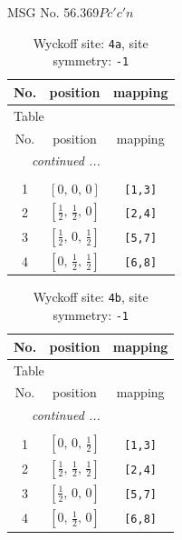 \documentclass[fleqn,8pt]{jsarticle}
\begin{document}
\setcounter{MaxMatrixCols}{32}

\renewcommand{\tablename}{Table~}
\renewcommand{\figurename}{Figure~}
\begin{center}
\LARGE
MSG No. 56.369\quad$Pc'c'n$
\end{center}
\renewcommand{\arraystretch}{1.2}
\begin{longtable}{ccc}
\caption{Wyckoff site: {\tt 4a}, site symmetry: {\tt -1}}
 \\
 \hline \hline
No. & position & mapping \\ \hline \endfirsthead

\multicolumn{2}{l}{\tablename\ \thetable{}} \\
 \hline \hline
No. & position & mapping \\ \hline \endhead

 \hline \hline
\multicolumn{2}{r}{\footnotesize\it continued ...} \\ \endfoot

 \hline \hline
\multicolumn{2}{r}{} \\ \endlastfoot

1 & $\left[ 0,\, 0,\, 0 \right]$ & {\tt [1,3]} \\ \hline
2 & $\left[ \frac{1}{2},\, \frac{1}{2},\, 0 \right]$ & {\tt [2,4]} \\ \hline
3 & $\left[ \frac{1}{2},\, 0,\, \frac{1}{2} \right]$ & {\tt [5,7]} \\ \hline
4 & $\left[ 0,\, \frac{1}{2},\, \frac{1}{2} \right]$ & {\tt [6,8]} \\
\end{longtable}
\renewcommand{\arraystretch}{1.2}
\begin{longtable}{ccc}
\caption{Wyckoff site: {\tt 4b}, site symmetry: {\tt -1}}
 \\
 \hline \hline
No. & position & mapping \\ \hline \endfirsthead

\multicolumn{2}{l}{\tablename\ \thetable{}} \\
 \hline \hline
No. & position & mapping \\ \hline \endhead

 \hline \hline
\multicolumn{2}{r}{\footnotesize\it continued ...} \\ \endfoot

 \hline \hline
\multicolumn{2}{r}{} \\ \endlastfoot

1 & $\left[ 0,\, 0,\, \frac{1}{2} \right]$ & {\tt [1,3]} \\ \hline
2 & $\left[ \frac{1}{2},\, \frac{1}{2},\, \frac{1}{2} \right]$ & {\tt [2,4]} \\ \hline
3 & $\left[ \frac{1}{2},\, 0,\, 0 \right]$ & {\tt [5,7]} \\ \hline
4 & $\left[ 0,\, \frac{1}{2},\, 0 \right]$ & {\tt [6,8]} \\
\end{longtable}
\end{document}
